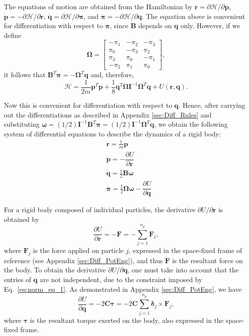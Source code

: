 \documentclass[aip,jcp,reprint,amsmath,amssymb]{revtex4-1}
\newcommand{\mt}[1]{\boldsymbol{\mathbf{#1}}}           %
\newcommand{\vt}[1]{\boldsymbol{\mathbf{#1}}}           %
\newcommand{\tr}[1]{#1^T}                               %
\newcommand{\diff}[2]{\dfrac{\partial #1}{\partial #2}} %
\begin{document}
The equations of motion are obtained from the Hamiltonian by $\dot{\vt r} = \partial \mathcal{H} / \partial \vt p$, $\dot{\vt p} = -\partial \mathcal{H} / \partial \vt r$, $\dot{\vt q} = \partial \mathcal{H} / \partial \vt \pi$, and $\dot{\vt \pi} = -\partial \mathcal{H} / \partial \vt q$.\cite{Goldstein2002} The equation above is convenient for differentiation with respect to $\vt \pi$, since $\mt B$ depends on $\vt q$ only. However, if we define
\[
\mt \Omega = \left[
\begin{array}{rrrr}
-\pi_1 & -\pi_2 & -\pi_3 \\
 \pi_0 & -\pi_3 &  \pi_2 \\
 \pi_3 &  \pi_0 & -\pi_1 \\
-\pi_2 &  \pi_1 &  \pi_0
\end{array}
\right],
\]
it follows that $\tr{\mt B}{\vt \pi} = -\tr{\mt \Omega}{\vt q}$ and, therefore,
\begin{equation}
\label{eq:H_with_Omega}
\mathcal{H} = \frac{1}{2m} \tr{\vt p} \vt p + \frac{1}{8} \tr{\vt q} {\mt \Omega} {\mt I}^{-1} \tr{\mt \Omega} \vt q + U(\vt r, \vt q).
\end{equation}

Now this is convenient for differentiation with respect to $\vt q$.  Hence, after carrying out the differentiations as described in Appendix \ref{sec:Diff_Rules} and substituting $\vt \omega = (1/2) {\mt I}^{-1} \tr{\mt B} \vt \pi = (1/2) {\mt I}^{-1} \tr{\mt \Omega} \vt q$, we obtain the following system of differential equations to describe the dynamics of a rigid body:
\begin{subequations}
\label{eq:EDO_system}
\begin{align}
&\dot{\vt r} = \frac{1}{m} \vt p \\
&\dot{\vt p} = -\diff{U}{\vt r} \\
&\dot{\vt q} = \frac{1}{2} \mt B \vt \omega \\
&\dot{\vt \pi} = \frac{1}{2} \mt \Omega \vt \omega - \diff{U}{\vt q}
\end{align}
\end{subequations}

For a rigid body composed of individual particles, the derivative $\partial U/\partial \vt r$ is obtained by
\[
\diff{U}{\vt r} = -\vt F = -\sum_{j=1}^{n_p} {\vt F_j},
\]
where $\vt F_j$ is the force applied on particle $j$, expressed in the space-fixed frame of reference (see Appendix \ref{sec:Diff_PotEng}), and thus $\vt F$ is the resultant force on the body. To obtain the derivative $\partial U/\partial \vt q$, one must take into account that the entries of $\vt q$ are not independent, due to the constraint imposed by Eq.~\ref{eq:norm_eq_1}. As demonstrated in Appendix \ref{sec:Diff_PotEng}, we have
\[
\diff{U}{\vt q} = -2 \mt C \vt \tau = -2 \mt C \sum_{j=1}^{n_p} {\vt \delta_j} \times {\vt F_j},
\]
where $\vt \tau$ is the resultant torque exerted on the body, also expressed in the space-fixed frame.
\end{document}
